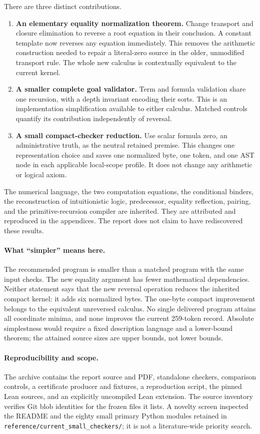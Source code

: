 \documentclass[11pt,letterpaper]{article}
\theoremstyle{definition}\newtheorem{definition}[theorem]{Definition}
\theoremstyle{remark}\newtheorem{remark}[theorem]{Remark}
\newcommand{\code}[1]{{\small\nolinkurl{#1}}}
\begin{document}
There are three distinct contributions.
\begin{enumerate}
\item \textbf{An elementary equality normalization theorem.} Change
  transport and closure elimination to reverse a root equation in their
  conclusion. A constant template now reverses any equation immediately.
  This removes the arithmetic construction needed to repair a literal-zero
  source in the older, unmodified transport rule. The whole new calculus
  is contextually equivalent to the current kernel.
\item \textbf{A smaller complete goal validator.} Term and formula
  validation share one recursion, with a depth invariant encoding their
  sorts. This is an implementation simplification available to either
  calculus. Matched controls quantify its contribution independently of
  reversal.
\item \textbf{A small compact-checker reduction.} Use scalar formula
  zero, an administrative truth, as the neutral retained premise. This
  changes one representation choice and saves one normalized byte, one
  token, and one AST node in each applicable local-scope profile. It does
  not change any arithmetic or logical axiom.
\end{enumerate}

The numerical language, the two computation equations, the conditional
binders, the reconstruction of intuitionistic logic, predecessor,
equality reflection, pairing, and the primitive-recursion compiler are
inherited. They are attributed and reproduced in the appendices. The
report does not claim to have rediscovered these results.

\paragraph{What ``simpler'' means here.}
The recommended program is smaller than a matched program with the same
input checks. The new equality argument has fewer mathematical
dependencies. Neither statement says that the new reversal operation
reduces the inherited compact kernel: it adds six normalized bytes.
The one-byte compact improvement belongs to the equivalent unreversed
calculus. No single delivered program attains all coordinate minima,
and none improves the current 259-token record. Absolute simplestness
would require a fixed description language and a lower-bound theorem;
the attained source sizes are upper bounds, not lower bounds.

\paragraph{Reproducibility and scope.}
The archive contains the report source and PDF, standalone checkers,
comparison controls, a certificate producer and fixtures, a reproduction
script, the pinned Lean sources, and an explicitly uncompiled Lean
extension. The source inventory verifies Git blob identities for the
frozen files it lists. A novelty screen inspected the README and the
eighty small primary Python modules retained in
\code{reference/current_small_checkers/}; it is not a literature-wide
priority search.
\end{document}
